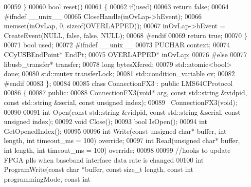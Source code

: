 \begin{DoxyCode}
00059     \}
00060     \textcolor{keywordtype}{bool} reset()
00061     \{
00062         \textcolor{keywordflow}{if}(used)
00063             \textcolor{keywordflow}{return} \textcolor{keyword}{false};
00064 \textcolor{preprocessor}{#ifndef \_\_unix\_\_}
00065         CloseHandle(inOvLap->hEvent);
00066         memset(inOvLap, 0, \textcolor{keyword}{sizeof}(OVERLAPPED));
00067         inOvLap->hEvent = CreateEvent(NULL, \textcolor{keyword}{false}, \textcolor{keyword}{false}, NULL);
00068 \textcolor{preprocessor}{#endif}
00069         \textcolor{keywordflow}{return} \textcolor{keyword}{true};
00070     \}
00071     \textcolor{keywordtype}{bool} used;
00072 \textcolor{preprocessor}{#ifndef \_\_unix\_\_}
00073     PUCHAR context;
00074     CCyUSBEndPoint* EndPt;
00075     OVERLAPPED* inOvLap;
00076 \textcolor{preprocessor}{#else}
00077     libusb\_transfer* transfer;
00078     \textcolor{keywordtype}{long} bytesXfered;
00079     std::atomic<bool> done;
00080     std::mutex transferLock;
00081     std::condition\_variable cv;
00082 \textcolor{preprocessor}{#endif}
00083 \};
00084 
00085 \textcolor{keyword}{class }ConnectionFX3 : \textcolor{keyword}{public} LMS64CProtocol
00086 \{
00087 \textcolor{keyword}{public}:
00088     ConnectionFX3(\textcolor{keywordtype}{void}* arg, \textcolor{keyword}{const} std::string &vidpid, \textcolor{keyword}{const} std::string &serial, \textcolor{keyword}{const} \textcolor{keywordtype}{unsigned} 
      index);
00089     ~ConnectionFX3(\textcolor{keywordtype}{void});
00090 
00091     \textcolor{keywordtype}{int} Open(\textcolor{keyword}{const} std::string &vidpid, \textcolor{keyword}{const} std::string &serial, \textcolor{keyword}{const} \textcolor{keywordtype}{unsigned} index);
00092     \textcolor{keywordtype}{void} Close();
00093     \textcolor{keywordtype}{bool} IsOpen();
00094     \textcolor{keywordtype}{int} GetOpenedIndex();
00095 
00096     \textcolor{keywordtype}{int} Write(\textcolor{keyword}{const} \textcolor{keywordtype}{unsigned} \textcolor{keywordtype}{char}* buffer, \textcolor{keywordtype}{int} length, \textcolor{keywordtype}{int} timeout_ms = 100) \textcolor{keyword}{override};
00097     \textcolor{keywordtype}{int} Read(\textcolor{keywordtype}{unsigned} \textcolor{keywordtype}{char}* buffer, \textcolor{keywordtype}{int} length, \textcolor{keywordtype}{int} timeout_ms = 100) \textcolor{keyword}{override};
00098 
00099     \textcolor{comment}{//hooks to update FPGA plls when baseband interface data rate is changed}
00100     \textcolor{keywordtype}{int} ProgramWrite(\textcolor{keyword}{const} \textcolor{keywordtype}{char} *buffer, \textcolor{keyword}{const} \textcolor{keywordtype}{size\_t} length, \textcolor{keyword}{const} \textcolor{keywordtype}{int} programmingMode, \textcolor{keyword}{const} \textcolor{keywordtype}{int} 

\end{DoxyCode}
